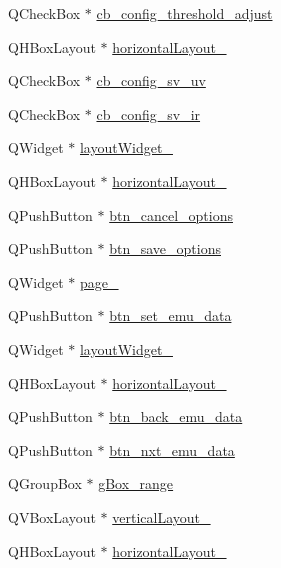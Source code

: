 \begin{DoxyCompactItemize}
\item 
Q\+Check\+Box $\ast$ \hyperlink{a00080_a433ffc427e1103e6c2939f949ee5e5b5}{cb\+\_\+config\+\_\+threshold\+\_\+adjust}
\item 
Q\+H\+Box\+Layout $\ast$ \hyperlink{a00080_a5a19bc8cf16dd2fbfa87ddaec41e2d75}{horizontal\+Layout\+\_}
\item 
Q\+Check\+Box $\ast$ \hyperlink{a00080_a3a93cd0a3f3738aad252d063a8677839}{cb\+\_\+config\+\_\+sv\+\_\+uv}
\item 
Q\+Check\+Box $\ast$ \hyperlink{a00080_a4db3ccfbbf8c5222dd2f042d3073bbe8}{cb\+\_\+config\+\_\+sv\+\_\+ir}
\item 
Q\+Widget $\ast$ \hyperlink{a00080_a11b1a1b252036633f800cedbf396286b}{layout\+Widget\+\_}
\item 
Q\+H\+Box\+Layout $\ast$ \hyperlink{a00080_acbfe65f9d2895246b00c82c815b5369e}{horizontal\+Layout\+\_}
\item 
Q\+Push\+Button $\ast$ \hyperlink{a00080_a39d7e34aed8750622569f0819dd7c8c2}{btn\+\_\+cancel\+\_\+options}
\item 
Q\+Push\+Button $\ast$ \hyperlink{a00080_a409e5b794dbab22d7b958be406b6a030}{btn\+\_\+save\+\_\+options}
\item 
Q\+Widget $\ast$ \hyperlink{a00080_a2a58b14a203be787ef1600453f795d71}{page\+\_}
\item 
Q\+Push\+Button $\ast$ \hyperlink{a00080_ad05944ce9c8afb0ab60549a326b8e0af}{btn\+\_\+set\+\_\+emu\+\_\+data}
\item 
Q\+Widget $\ast$ \hyperlink{a00080_a873441ec9cec68e0d4eacee271765553}{layout\+Widget\+\_}
\item 
Q\+H\+Box\+Layout $\ast$ \hyperlink{a00080_a9403b9a7c13814220caeb1748ef9e672}{horizontal\+Layout\+\_}
\item 
Q\+Push\+Button $\ast$ \hyperlink{a00080_ab6199bde688a9b2e91e192278190dda7}{btn\+\_\+back\+\_\+emu\+\_\+data}
\item 
Q\+Push\+Button $\ast$ \hyperlink{a00080_a11126ea7922009f1354c9bfefb93f5e9}{btn\+\_\+nxt\+\_\+emu\+\_\+data}
\item 
Q\+Group\+Box $\ast$ \hyperlink{a00080_a3c12d0504a310784c3820d1a9ad469c2}{g\+Box\+\_\+range}
\item 
Q\+V\+Box\+Layout $\ast$ \hyperlink{a00080_a0c01bad60d9f422a1258e710635a2f65}{vertical\+Layout\+\_}
\item 
Q\+H\+Box\+Layout $\ast$ \hyperlink{a00080_a03ce63974cc69b067c91bbf285cceca8}{horizontal\+Layout\+\_}
\item 

\end{DoxyCompactItemize}

